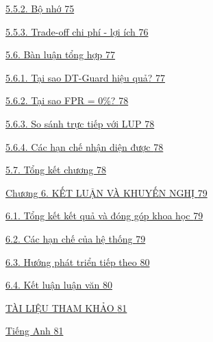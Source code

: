 \hyperref[bux1ed9-nhux1edb]{5.5.2. Bộ nhớ \hyperref[bux1ed9-nhux1edb]{75}}

\hyperref[trade-off-chi-phuxed---lux1ee3i-uxedch]{5.5.3. Trade-off chi phí - lợi ích \hyperref[trade-off-chi-phuxed---lux1ee3i-uxedch]{76}}

\hyperref[buxe0n-luux1eadn-tux1ed5ng-hux1ee3p]{5.6. Bàn luận tổng hợp \hyperref[buxe0n-luux1eadn-tux1ed5ng-hux1ee3p]{77}}

\hyperref[tux1ea1i-sao-dt-guard-hiux1ec7u-quux1ea3]{5.6.1. Tại sao DT-Guard hiệu quả? \hyperref[tux1ea1i-sao-dt-guard-hiux1ec7u-quux1ea3]{77}}

\hyperref[tux1ea1i-sao-fpr-0]{5.6.2. Tại sao FPR = 0\%? \hyperref[tux1ea1i-sao-fpr-0]{78}}

\hyperref[so-suxe1nh-trux1ef1c-tiux1ebfp-vux1edbi-lup]{5.6.3. So sánh trực tiếp với LUP \hyperref[so-suxe1nh-trux1ef1c-tiux1ebfp-vux1edbi-lup]{78}}

\hyperref[cuxe1c-hux1ea1n-chux1ebf-nhux1eadn-diux1ec7n-ux111ux1b0ux1ee3c]{5.6.4. Các hạn chế nhận diện được \hyperref[cuxe1c-hux1ea1n-chux1ebf-nhux1eadn-diux1ec7n-ux111ux1b0ux1ee3c]{78}}

\hyperref[tux1ed5ng-kux1ebft-chux1b0ux1a1ng-3]{5.7. Tổng kết chương \hyperref[tux1ed5ng-kux1ebft-chux1b0ux1a1ng-3]{78}}

\hyperref[chux1b0ux1a1ng-6.-kux1ebft-luux1eadn-vuxe0-khuyux1ebfn-nghux1ecb]{Chương 6. KẾT LUẬN VÀ KHUYẾN NGHỊ \hyperref[chux1b0ux1a1ng-6.-kux1ebft-luux1eadn-vuxe0-khuyux1ebfn-nghux1ecb]{79}}

\hyperref[tux1ed5ng-kux1ebft-kux1ebft-quux1ea3-vuxe0-ux111uxf3ng-guxf3p-khoa-hux1ecdc]{6.1. Tổng kết kết quả và đóng góp khoa học \hyperref[tux1ed5ng-kux1ebft-kux1ebft-quux1ea3-vuxe0-ux111uxf3ng-guxf3p-khoa-hux1ecdc]{79}}

\hyperref[cuxe1c-hux1ea1n-chux1ebf-cux1ee7a-hux1ec7-thux1ed1ng]{6.2. Các hạn chế của hệ thống \hyperref[cuxe1c-hux1ea1n-chux1ebf-cux1ee7a-hux1ec7-thux1ed1ng]{79}}

\hyperref[hux1b0ux1edbng-phuxe1t-triux1ec3n-tiux1ebfp-theo]{6.3. Hướng phát triển tiếp theo \hyperref[hux1b0ux1edbng-phuxe1t-triux1ec3n-tiux1ebfp-theo]{80}}

\hyperref[kux1ebft-luux1eadn-luux1eadn-vux103n]{6.4. Kết luận luận văn \hyperref[kux1ebft-luux1eadn-luux1eadn-vux103n]{80}}

\hyperref[tuxe0i-liux1ec7u-tham-khux1ea3o]{TÀI LIỆU THAM KHẢO \hyperref[tuxe0i-liux1ec7u-tham-khux1ea3o]{81}}

\hyperref[tiux1ebfng-anh]{Tiếng Anh \hyperref[tiux1ebfng-anh]{81}}

